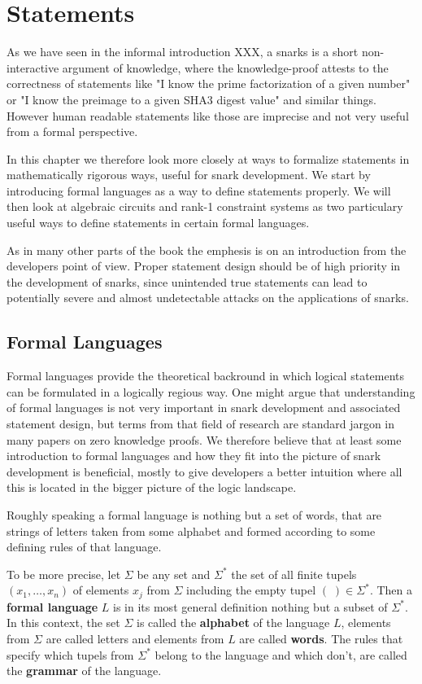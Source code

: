 \chapter{Statements}
As we have seen in the informal introduction XXX, a snarks is a short non-interactive argument of knowledge, where the knowledge-proof attests to the correctness of statements like "I know the prime factorization of a given number" or "I know the preimage to a given SHA3 digest value" and similar things. However human readable statements like those are imprecise and not very useful from a formal perspective. 

In this chapter we therefore look more closely at ways to formalize statements in mathematically rigorous ways, useful for snark development. We start by introducing formal languages as a way to define statements properly. We will then look at algebraic circuits and rank-1 constraint systems as two particulary useful ways to define statements in certain formal languages.

As in many other parts of the book the emphesis is on an introduction from the developers point of view. Proper statement design should be of high priority in the development of snarks, since unintended true statements can lead to potentially severe and almost undetectable attacks on the applications of snarks.

\section{Formal Languages} Formal languages provide the theoretical backround in which logical statements can be formulated in a logically regious way. One might argue that understanding of formal languages is not very important in snark development and associated statement design, but terms from that field of research are standard jargon in many papers on zero knowledge proofs. We therefore believe that at least some introduction to formal languages and how they fit into the picture of snark development is beneficial, mostly to give developers a better intuition where all this is located in the bigger picture of the logic landscape.

Roughly speaking a formal language is nothing but a set of words, that are strings of letters taken from some alphabet and formed according to some defining rules of that language. 

To be more precise, let $\Sigma$ be any set and $\Sigma^*$ the set of all finite tupels $(x_1,\ldots,x_n)$ of elements $x_j$ from $\Sigma$ including the empty tupel $(\;)\in \Sigma^*$. Then a \textbf{formal language} $L$ is in its most general definition nothing but a subset of $\Sigma^*$. In this context, the set $\Sigma$ is called the \textbf{alphabet} of the language $L$, elements from $\Sigma$ are called letters and elements from $L$ are called \textbf{words}. The rules that specify which tupels from $\Sigma^*$ belong to the language and which don't, are called the \textbf{grammar} of the language. 

